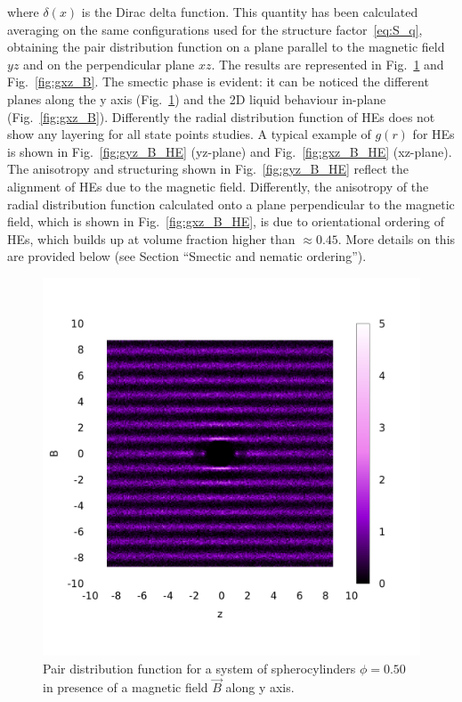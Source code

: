 \documentclass[aip,graphicx]{revtex4-1} %
\begin{document}
where $\delta(x)$ is the Dirac delta function. This quantity has been calculated averaging on the same configurations used for the structure
factor~\ref{eq:S_q}, obtaining the pair  distribution function on a plane parallel to the magnetic field $yz$ and on the perpendicular plane $xz$. The results
are represented in Fig.~\ref{fig:gyz_B} and Fig.~\ref{fig:gxz_B}.  The smectic phase is evident: it can be noticed the different planes along the y axis
(Fig.~\ref{fig:gyz_B}) and the 2D liquid behaviour in-plane (Fig.~\ref{fig:gxz_B}). Differently the radial distribution function of HEs does not show any
layering for all state points studies. A typical example of $g(r)$ for HEs is shown in Fig.~\ref{fig:gyz_B_HE} (yz-plane) and Fig.~\ref{fig:gxz_B_HE}
(xz-plane). The anisotropy and structuring shown in Fig.~\ref{fig:gyz_B_HE} reflect the alignment of HEs due to the magnetic field. Differently, the anisotropy
of the radial distribution function calculated onto a plane perpendicular to the magnetic field, which is shown in Fig.~\ref{fig:gxz_B_HE}, is due to 
orientational ordering of HEs, which builds up at volume fraction higher than $\approx 0.45$.  More details on this are provided below (see Section ``Smectic
and nematic ordering'').

\begin{figure}
    \begin{center}
    \includegraphics[width=0.7\columnwidth]{gyz_B.png}
    \caption{Pair distribution function for a system of spherocylinders $\phi = 0.50$ in presence of a magnetic field $\vec{B}$ along y axis.}\label{fig:gyz_B}
    \end{center}
\end{figure}
\end{document}
